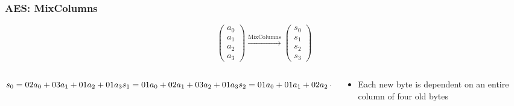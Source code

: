 \documentclass[12pt]{beamer}
\begin{document}
\begin{frame}
\frametitle{AES: MixColumns}

\[
\left( \begin{array}{c}
a_0 \\
a_1 \\
a_2 \\
a_3\end{array} \right)
\xrightarrow{\text{MixColumns}}
\left( \begin{array}{c}
s_0 \\
s_1 \\
s_2 \\
s_3\end{array} \right)
\]

\begin{columns}
\begin{column}{0.5\textwidth}
\pause
\begin{center}
$
s_0 = {02}a_0+{03}a_1+{01}a_2+{01}a_3 \\[0pt]
s_1 = {01}a_0+{02}a_1+{03}a_2+{01}a_3 \\[0pt]
s_2 = {01}a_0+{01}a_1+{02}a_2+{03}a_3 \\[0pt]
s_3 = {03}a_0+{01}a_1+{01}a_2+{02}a_3 \\[0pt]
$
\end{center}
\end{column}
\begin{column}{0.5\textwidth}
\begin{itemize}
\pause
\item Each new byte is dependent on an entire column of four old bytes
\end{itemize}
\end{column}
\end{columns}
\end{frame}
\end{document}
